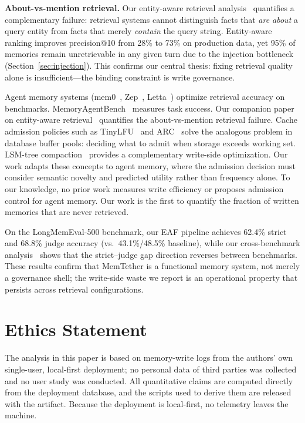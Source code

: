 \documentclass[10pt,twocolumn]{article}
\begin{document}
\textbf{About-vs-mention retrieval.} Our entity-aware retrieval analysis~\cite{companionjss}
quantifies a complementary failure: retrieval systems cannot distinguish facts that \emph{are about}
a query entity from facts that merely \emph{contain} the query string. Entity-aware ranking improves
precision@10 from 28\% to 73\% on production data, yet 95\% of memories remain unretrievable in any
given turn due to the injection bottleneck (Section~\ref{sec:injection}). This confirms our central
thesis: fixing retrieval quality alone is insufficient---the binding constraint is write governance.

Agent memory systems (mem0~\cite{mem0}, Zep~\cite{zep}, Letta~\cite{letta}) optimize retrieval accuracy on benchmarks. MemoryAgentBench~\cite{mab} measures task success. Our companion paper on entity-aware retrieval~\cite{companionjss} quantifies the about-vs-mention retrieval failure. Cache admission policies such as TinyLFU~\cite{tinylfu} and ARC~\cite{arc} solve the analogous problem in database buffer pools: deciding what to admit when storage exceeds working set. LSM-tree compaction~\cite{lsm} provides a complementary write-side optimization. Our work adapts these concepts to agent memory, where the admission decision must consider semantic novelty and predicted utility rather than frequency alone. To our knowledge, no prior work measures write efficiency or proposes admission control for agent memory. Our work is the first to quantify the fraction of written memories that are never retrieved.

On the LongMemEval-500 benchmark, our EAF pipeline achieves 62.4\% strict and 68.8\% judge accuracy (vs.\ 43.1\%/48.5\% baseline), while our cross-benchmark analysis~\cite{companioncrossbench} shows that the strict--judge gap direction reverses between benchmarks. These results confirm that MemTether is a functional memory system, not merely a governance shell; the write-side waste we report is an operational property that persists across retrieval configurations.

\section*{Ethics Statement}
The analysis in this paper is based on memory-write logs from the authors' own single-user, local-first deployment; no personal data of third parties was collected and no user study was conducted. All quantitative claims are computed directly from the deployment database, and the scripts used to derive them are released with the artifact. Because the deployment is local-first, no telemetry leaves the machine.
\end{document}

